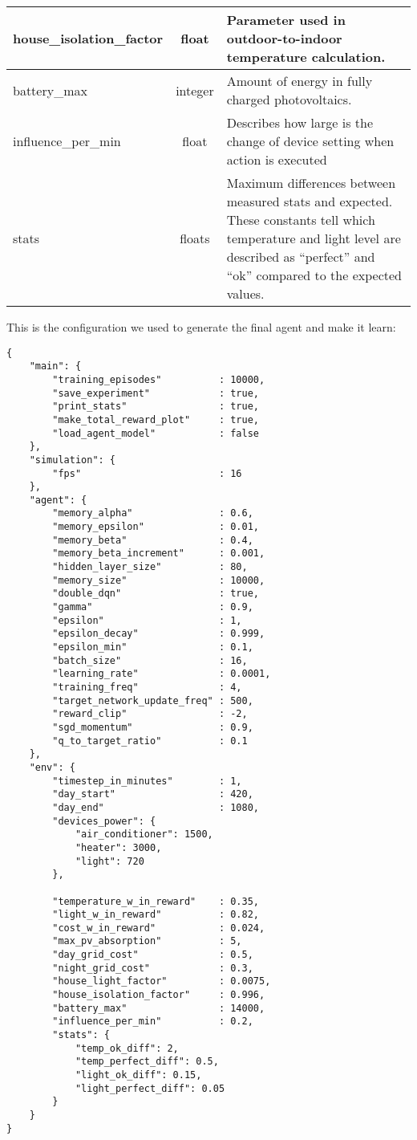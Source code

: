 \documentclass{article}
\begin{document}
\begin{longtable}{l|c|p{9cm}}
    \hline
    house\_isolation\_factor & float & Parameter used in outdoor-to-indoor temperature calculation.\\
    \hline
    battery\_max & integer & Amount of energy in fully charged photovoltaics.\\
    \hline
    influence\_per\_min & float & Describes how large is the change of device setting when action is executed\\
    \hline
    stats & floats & Maximum differences between measured stats and expected. These constants tell which temperature and light level are described as “perfect” and “ok” compared to the expected values.
\end{longtable}

This is the configuration we used to generate the final agent and make it learn:

\begin{lstlisting}
{
    "main": {
        "training_episodes"          : 10000,
        "save_experiment"            : true,
        "print_stats"                : true,
        "make_total_reward_plot"     : true,
        "load_agent_model"           : false
    },
    "simulation": {
        "fps"                        : 16
    },
    "agent": {
    	"memory_alpha"               : 0.6,
        "memory_epsilon"             : 0.01,
        "memory_beta"                : 0.4,
        "memory_beta_increment"      : 0.001,
        "hidden_layer_size"          : 80,
        "memory_size"                : 10000,
        "double_dqn"                 : true,
        "gamma"                      : 0.9,
        "epsilon"                    : 1,
        "epsilon_decay"              : 0.999,
        "epsilon_min"                : 0.1,
        "batch_size"                 : 16,
        "learning_rate"              : 0.0001,
        "training_freq"              : 4,
        "target_network_update_freq" : 500,
        "reward_clip"                : -2,
        "sgd_momentum"               : 0.9,
        "q_to_target_ratio"          : 0.1
    },
    "env": {
        "timestep_in_minutes"        : 1,
        "day_start"                  : 420,
        "day_end"                    : 1080,
        "devices_power": {
            "air_conditioner": 1500,
            "heater": 3000,
            "light": 720
        },

        "temperature_w_in_reward"    : 0.35,
        "light_w_in_reward"          : 0.82,
        "cost_w_in_reward"           : 0.024,
        "max_pv_absorption"          : 5,
        "day_grid_cost"              : 0.5,
        "night_grid_cost"            : 0.3,
        "house_light_factor"         : 0.0075,
        "house_isolation_factor"     : 0.996,
        "battery_max"                : 14000,
        "influence_per_min"          : 0.2,
        "stats": {
            "temp_ok_diff": 2,
            "temp_perfect_diff": 0.5,
            "light_ok_diff": 0.15,
            "light_perfect_diff": 0.05
        }
    }
}
\end{lstlisting}
\end{document}

